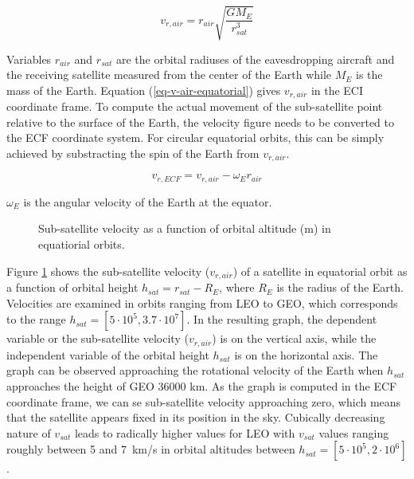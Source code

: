 \documentclass[english, 12pt, a4paper, elec, utf8, a-1b, online]{aaltothesis}
\begin{document}
\begin{equation} \label{eq-v-air-equatorial}
  v_{r, air} = r_{air} \sqrt{\frac{G M_E}{r_{sat}^3}}
\end{equation}

\noindent
Variables $r_{air}$ and $r_{sat}$ are the orbital radiuses of the eavesdropping aircraft and the receiving satellite measured from the center of the Earth while $M_E$ is the mass of the Earth.
Equation (\ref{eq-v-air-equatorial}) gives $v_{r, air}$ in the ECI coordinate frame.
To compute the actual movement of the sub-satellite point relative to the surface of the Earth, the velocity figure needs to be converted to the ECF coordinate system.
For circular equatorial orbits, this can be simply achieved by substracting the spin of the Earth from $v_{r, air}$.

\begin{equation}
  v_{r, ECF} = v_{r, air} - \omega_E r_{air}
\end{equation}

\noindent
$\omega_E$ is the angular velocity of the Earth at the equator.

\begin{figure}[h]
  \centering
  
  \caption{Sub-satellite velocity as a function of orbital altitude (m) in equatiorial orbits.}
  \label{fig-subsat-velocity-equatiorial}
\end{figure}

Figure \ref{fig-subsat-velocity-equatiorial} shows the sub-satellite velocity ($v_{r, air}$) of a satellite in equatorial orbit as a function of orbital height $h_{sat} = r_{sat} - R_{E}$, where $R_{E}$ is the radius of the Earth.
Velocities are examined in orbits ranging from LEO to GEO, which corresponds to the range $h_{sat} = [5 \cdot 10^5, 3.7 \cdot 10^7]$.
In the resulting graph, the dependent variable or the sub-satellite velocity ($v_{r, air}$) is on the vertical axis, while the independent variable of the orbital height $h_{sat}$ is on the horizontal axis.
The graph can be observed approaching the rotational velocity of the Earth when $h_{sat}$ approaches the height of GEO 36000 km.
As the graph is computed in the ECF coordinate frame, we can se sub-satellite velocity approaching zero, which means that the satellite appears fixed in its position in the sky.
Cubically decreasing nature of $v_{sat}$ leads to radically higher values for LEO with $v_{sat}$ values ranging roughly between 5 and 7\ km/s in orbital altitudes between $h_{sat} = [5 \cdot 10^5, 2 \cdot 10^6]$.
\end{document}
